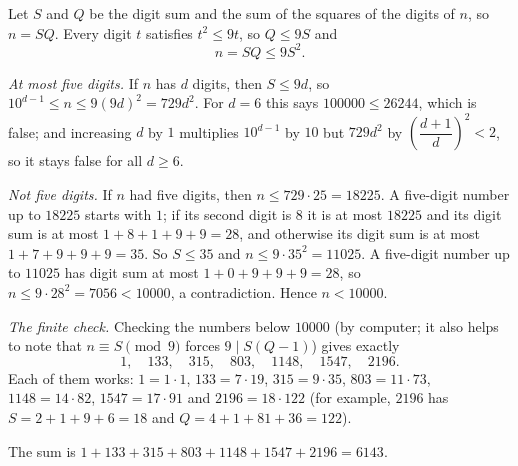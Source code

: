 Let $S$ and $Q$ be the digit sum and the sum of the squares of the digits of $n$, so $n=SQ$. Every digit $t$ satisfies $t^2\le9t$, so $Q\le9S$ and
\[n=SQ\le9S^2.\]

\emph{At most five digits.} If $n$ has $d$ digits, then $S\le9d$, so $10^{d-1}\le n\le9(9d)^2=729d^2$. For $d=6$ this says $100000\le26244$, which is false; and increasing $d$ by $1$ multiplies $10^{d-1}$ by $10$ but $729d^2$ by $\left(\dfrac{d+1}{d}\right)^2<2$, so it stays false for all $d\ge6$.

\emph{Not five digits.} If $n$ had five digits, then $n\le729\cdot25=18225$. A five-digit number up to $18225$ starts with $1$; if its second digit is $8$ it is at most $18225$ and its digit sum is at most $1+8+1+9+9=28$, and otherwise its digit sum is at most $1+7+9+9+9=35$. So $S\le35$ and $n\le9\cdot35^2=11025$. A five-digit number up to $11025$ has digit sum at most $1+0+9+9+9=28$, so $n\le9\cdot28^2=7056<10000$, a contradiction. Hence $n<10000$.

\emph{The finite check.} Checking the numbers below $10000$ (by computer; it also helps to note that $n\equiv S\pmod 9$ forces $9\mid S(Q-1)$) gives exactly
\[1,\quad133,\quad315,\quad803,\quad1148,\quad1547,\quad2196.\]
Each of them works: $1=1\cdot1$, $133=7\cdot19$, $315=9\cdot35$, $803=11\cdot73$, $1148=14\cdot82$, $1547=17\cdot91$ and $2196=18\cdot122$ (for example, $2196$ has $S=2+1+9+6=18$ and $Q=4+1+81+36=122$).

The sum is $1+133+315+803+1148+1547+2196=\boxed{6143}$.

